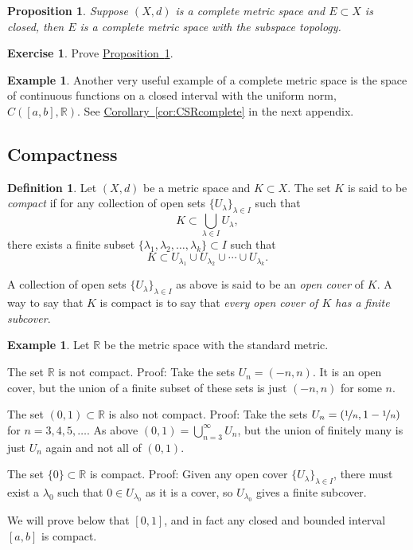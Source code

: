 \documentclass[12pt,openany]{book}
\newcommand{\R}{{\mathbb{R}}}
\newcommand{\myindex}[1]{#1\index{#1}}
\theoremstyle{plain}
\newtheorem{prop}[thm]{Proposition}
\theoremstyle{remark}
\theoremstyle{definition}
\newtheorem{defn}[thm]{Definition}
\newenvironment{exbox}{%
    \def\FrameCommand{\vrule width 1pt \relax\hspace{10pt}}%
    \MakeFramed{\advance\hsize-\width\FrameRestore}%
}{%
    \endMakeFramed
}
\theoremstyle{exercise}
\newtheorem{exercise}{Exercise}[section]
\theoremstyle{example}
\newtheorem{example}[thm]{Example}
\newcommand{\propref}[1]{\hyperref[#1]{Proposition~\ref*{#1}}}
\newcommand{\corref}[1]{\hyperref[#1]{Corollary~\ref*{#1}}}
\begin{document}
\begin{prop} \label{prop:closedcomplete}
Suppose $(X,d)$ is a complete metric space and $E \subset X$
is closed, then $E$ is a complete metric space with the subspace topology.
\end{prop}

\begin{exbox}
\begin{exercise}%
Prove \propref{prop:closedcomplete}.
\end{exercise}
\end{exbox}

\begin{example}
Another very useful example of a complete metric space is the space of
continuous functions on a closed interval with the uniform norm, $C([a,b],\R)$.
See \corref{cor:CSRcomplete} in the next appendix.
\end{example}

\subsection{Compactness}

\begin{defn}
Let $(X,d)$ be a metric space and $K \subset X$. 
The set $K$ is said to be \emph{\myindex{compact}}
if for any collection
of open sets $\{ U_{\lambda} \}_{\lambda \in I}$ such that
\begin{equation*}
K \subset \bigcup_{\lambda \in I} U_\lambda ,
\end{equation*}
there exists a finite subset
$\{ \lambda_1, \lambda_2,\ldots,\lambda_k \} \subset I$
such that
\begin{equation*}
K \subset U_{\lambda_1} \cup U_{\lambda_2} \cup \cdots \cup U_{\lambda_k} .
\end{equation*}
\end{defn}

A collection of open sets $\{ U_{\lambda} \}_{\lambda \in I}$ as above is
said to be an \emph{\myindex{open cover}} of $K$.  A way to say that
$K$ is compact is to say that \emph{every open cover of $K$ has a finite
\myindex{subcover}}.

\begin{example}
Let $\R$ be the metric space with the standard metric.

The set $\R$ is not compact.  Proof: Take the sets $U_n = (-n,n)$.
It is an open cover, but the union of a finite subset of these sets
is just $(-n,n)$ for some $n$.

The set $(0,1) \subset \R$ is also not compact.  Proof:  Take the 
sets $U_{n} = (\nicefrac{1}{n},1-\nicefrac{1}{n})$ for $n=3,4,5,\ldots$.
As above $(0,1) = \bigcup_{n=3}^\infty U_n$, but the union of finitely many
is just $U_n$ again and not all of $(0,1)$.

The set $\{ 0 \} \subset \R$ is compact.  Proof: Given any open cover $\{
U_{\lambda} \}_{\lambda \in I}$, there must exist a $\lambda_0$ such that $0
\in U_{\lambda_0}$ as it is a cover, so $U_{\lambda_0}$ gives a
finite subcover.

We will prove below that $[0,1]$, and in fact any closed and bounded
interval $[a,b]$ is compact.
\end{example}
\end{document}
